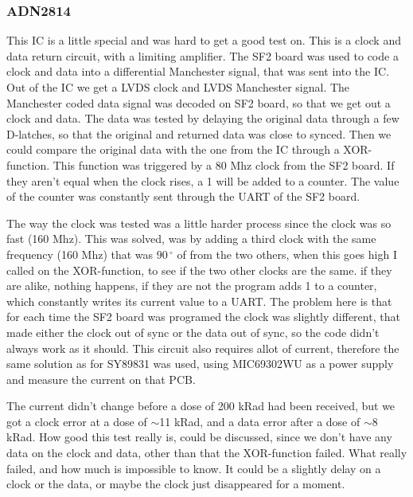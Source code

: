 \documentclass[12pt]{article}
\numberwithin{figure}{section}
\begin{document}
\subsubsection{ADN2814}
This \ac{IC} is a little special and was hard to get a good test on. This is a clock and data return circuit, with a limiting amplifier.
The SF2 board was used to code a clock and data into a differential Manchester signal, that was sent into the IC. Out of the IC we get a LVDS clock and LVDS Manchester signal. The Manchester coded data signal was decoded on SF2 board, so that we get out a clock and data. The data was tested by delaying the original data through a few D-latches, so that the original and returned data was close to synced. Then we could compare the original data with the one from the \ac{IC} through a XOR-function. This function was triggered by a 80 Mhz clock from the \ac{SF2} board. If they aren't equal when the clock rises, a 1 will be added to a counter. The value of the counter was constantly sent through the UART of the SF2 board.

The way the clock was tested was a little harder process since the clock was so fast (160 Mhz).
This was solved, was by adding a third clock with the same frequency (160 Mhz) that was $90\,^{\circ}$ of from the two others, when this goes high I called on the XOR-function, to see if the two other clocks are the same. if they are alike, nothing happens, if they are not the program adds 1 to a counter, which constantly writes its current value to a \acf{UART}.
The problem here is that for each time the \ac{SF2} board was programed the clock was slightly different, that made either the clock out of sync or the data out of sync, so the code didn't always work as it should.
This circuit also requires allot of current, therefore the same solution as for SY89831 was used, using MIC69302WU as a power supply and measure the current on that PCB.

The current didn't change before a dose of 200 kRad had been received, but we got a clock error at a dose of $ \sim $11 kRad, and a data error after a dose of $ \sim $8 kRad.
How good this test really is, could be discussed, since we don't have any data on the clock and data, other than that the XOR-function failed. What really failed, and how much is impossible to know. It could be a slightly delay on a clock or the data, or maybe the clock just disappeared for a moment.
\end{document}
